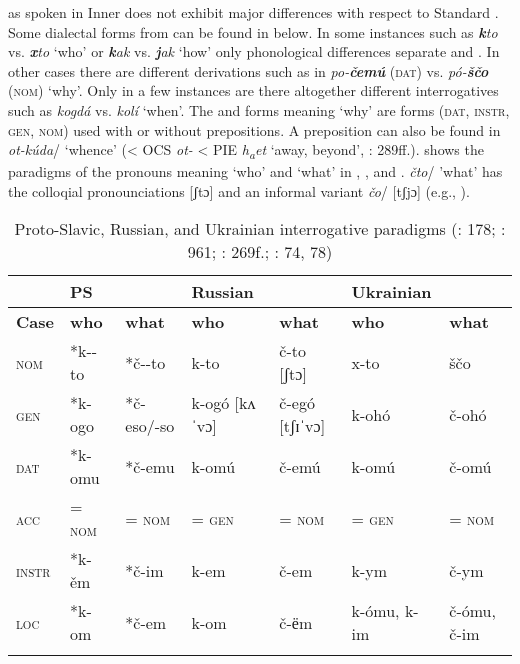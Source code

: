  as spoken in Inner  does not exhibit major differences with respect to Standard . Some dialectal forms from  can be found in  below. In some instances such as \textbf{\textit{k}}\textit{to} vs. \textbf{\textit{x}}\textit{to} ‘who’ or \textbf{\textit{k}}\textit{ak} vs. \textbf{\textit{j}}\textit{ak} ‘how’ only phonological differences separate  and . In other cases there are different derivations such as in \textit{po-}\textbf{\textit{čemú}} (\textsc{dat}) vs. \textit{pó-}\textbf{\textit{ščo}} (\textsc{nom}) ‘why’. Only in a few instances are there altogether different interrogatives such as \textit{kogdá} vs. \textit{kolí} ‘when’. The  and  forms meaning ‘why’ are  forms (\textsc{dat}, \textsc{instr}, \textsc{gen}, \textsc{nom}) used with or without prepositions. A preposition can also be found in  \textit{ot-kúda}/ ‘whence’ (< OCS \textit{ot-} < PIE \textit{h\textsubscript{a}}\textit{et} ‘away, beyond’, \citealt{MalloryAdams2006}: 289ff.).  shows the paradigms of the  pronouns meaning ‘who’ and ‘what’ in , , and .  \textit{čto}/ ’what’ has the colloqial pronounciations [ʃtɔ] and an informal variant \textit{čo}/ [tʃjɔ] (e.g., \citealt{BaiPing2011}).

\begin{table}
\caption{Proto-Slavic, Russian, and Ukrainian interrogative paradigms (\citealt{PughPress1999}: 178; \citealt{Shevelov1993}: 961; \citealt{SussexCubberley2006}: 269f.; \citealt{BaiPing2011}: 74, 78)}

\label{tab:indo:12}

\begin{tabularx}{\textwidth}{lllllQQ}
\lsptoprule
& \textbf{PS} &  & \textbf{Russian} &  & \textbf{Ukrainian} & \\
\midrule
\textbf{Case} & \textbf{who} & \textbf{what} & \textbf{who} & \textbf{what} & \textbf{who} & \textbf{what}\\
\textsc{nom} & *k--to & *č--to & k-to & č-to [ʃtɔ] & x-to & ščo\\
\textsc{gen} & *k-ogo & *č-eso/-so & k-ogó [kʌˈvɔ] & č-egó [tʃɪˈvɔ] & k-ohó & č-ohó\\
\textsc{dat} & *k-omu & *č-emu & k-omú & č-emú & k-omú & č-omú\\
\textsc{acc} & = \textsc{nom} & = \textsc{nom} & = \textsc{gen} & = \textsc{nom} & = \textsc{gen} & = \textsc{nom}\\
\textsc{instr} & *k-ěm & *č-im & k-em & č-em & k-ym & č-ym\\
\textsc{loc} & *k-om & *č-em & k-om & č-ёm & k-ómu, k-im & č-ómu, č-im\\
\lspbottomrule
\end{tabularx}
\end{table}

